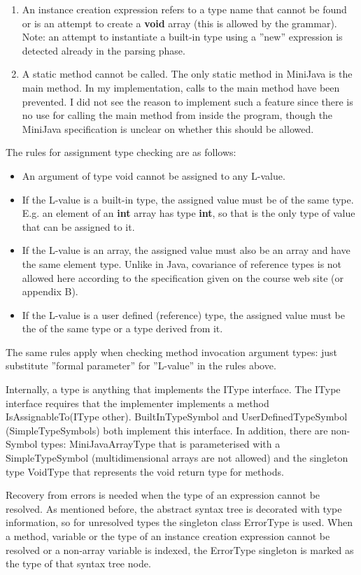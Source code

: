 \documentclass[a4paper,11pt]{article}
\begin{document}
\begin{enumerate}
\item An instance creation expression refers to a type name that cannot be found or is an attempt to create a \textbf{void} array (this is allowed by the grammar). Note: an attempt to instantiate a built-in type using a ''new'' expression is detected already in the parsing phase.
\item A static method cannot be called. The only static method in MiniJava is the main method. In my implementation, calls to the main method have been prevented. I did not see the reason to implement such a feature since there is no use for calling the main method from inside the program, though the MiniJava specification is unclear on whether this should be allowed.
\end{enumerate}

The rules for assignment type checking are as follows:
\begin{itemize}
\item An argument of type void cannot be assigned to any L-value.
\item If the L-value is a built-in type, the assigned value must be of the same type. E.g. an element of an \textbf{int} array has type \textbf{int}, so that is the only type of value that can be assigned to it.
\item If the L-value is an array, the assigned value must also be an array and have the same element type. Unlike in Java, covariance of reference types is not allowed here according to the specification given on the course web site (or appendix B).
\item If the L-value is a user defined (reference) type, the assigned value must be the of the same type or a type derived from it.
\end{itemize}

The same rules apply when checking method invocation argument types: just substitute ''formal parameter'' for ''L-value'' in the rules above.

Internally, a type is anything that implements the IType interface. The IType interface requires that the implementer implements a method IsAssignableTo(IType other). BuiltInTypeSymbol and UserDefinedTypeSymbol (SimpleTypeSymbols) both implement this interface. In addition, there are non-Symbol types: MiniJavaArrayType that is parameterised with a SimpleTypeSymbol (multidimensional arrays are not allowed) and the singleton type VoidType that represents the void return type for methods.

Recovery from errors is needed when the type of an expression cannot be resolved. As mentioned before, the abstract syntax tree is decorated with type information, so for unresolved types the singleton class ErrorType is used. When a method, variable or the type of an instance creation expression cannot be resolved or a non-array variable is indexed, the ErrorType singleton is marked as the type of that syntax tree node.
\end{document}
